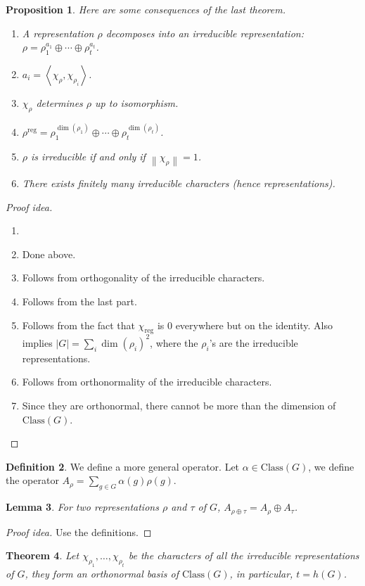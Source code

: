 \documentclass[paper=a4, fontsize=12pt]{scrartcl} %
\newtheorem{thm}{Theorem}
\newtheorem{prop}[thm]{Proposition}
\newtheorem{lem}[thm]{Lemma}
\theoremstyle{definition}
\newtheorem{defn}[thm]{Definition}
\theoremstyle{remark}
\newcommand{\norm}[1]{\left\lVert #1 \right\rVert}
\newcommand{\inp}[2]{\left\langle #1, #2 \right\rangle}
\begin{document}
\begin{prop}
	Here are some consequences of the last theorem.
	\begin{enumerate}
		\item A representation $\rho$ decomposes into an irreducible representation: $\rho = \rho_1^{a_1} \oplus \cdots \oplus \rho_t^{a_t}$.
		\item $a_i = \inp{\chi_{\rho}}{\chi_{\rho_i}}$.
		\item $\chi_{\rho}$ determines $\rho$ up to isomorphism.
		\item $\rho^{\text{reg}} = \rho_1^{\dim(\rho_1)} \oplus \cdots \oplus \rho_t^{\dim(\rho_t)}$.
		\item $\rho$ is irreducible if and only if $\norm{\chi_{\rho}} = 1$.
		\item There exists finitely many irreducible characters (hence representations).
	\end{enumerate}
\end{prop}
\begin{proof}[Proof idea]
	\begin{enumerate}
		\item[]
		\item Done above.
		\item Follows from orthogonality of the irreducible characters.
		\item Follows from the last part.
		\item Follows from the fact that $\chi_{\text{reg}}$ is 0 everywhere but on the identity. Also implies $|G| = \sum_i \dim(\rho_i)^2$, where the $\rho_i$'s are the irreducible representations.
		\item Follows from orthonormality of the irreducible characters.
		\item Since they are orthonormal, there cannot be more than the dimension of $\text{Class}(G)$.
	\end{enumerate}
\end{proof}
\begin{defn}
	We define a more general operator. Let $\alpha \in \text{Class}(G)$, we define the operator $A_{\rho} = \sum_{g \in G} \alpha(g)\rho(g)$.
\end{defn}
\begin{lem}
	For two representations $\rho$ and $\tau$ of $G$, $A_{\rho \oplus \tau} = A_{\rho} \oplus A_{\tau}$.
\end{lem}
\begin{proof}[Proof idea]
	Use the definitions.
\end{proof}
\begin{thm}
	Let $\chi_{\rho_1}, \dots, \chi_{\rho_t}$ be the characters of all the irreducible representations of $G$, they form an orthonormal basis of $\text{Class}(G)$, in particular, $t = h(G)$.
\end{thm}
\end{document}
